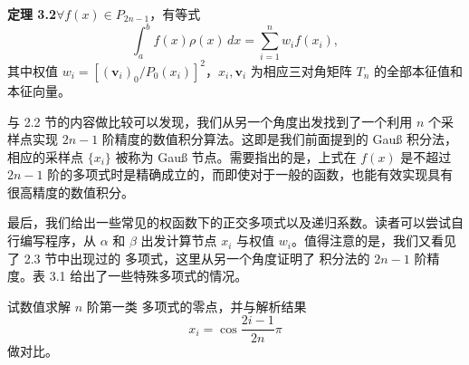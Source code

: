 \textbf{定理 3.2}\quad $\forall f(x)\in P_{2n-1}$，有等式
\begin{equation}
\int_a^b f(x)\rho(x)\,dx=\sum_{i=1}^n w_i f(x_i),
\tag{3.5.44}
\end{equation}
其中权值 $w_i=[(\bm v_i)_0/P_0(x_i)]^2$，$x_i,\bm v_i$ 为相应三对角矩阵 $T_n$ 的全部本征值和本征向量。

与 2.2 节的内容做比较可以发现，我们从另一个角度出发找到了一个利用 $n$ 个采样点实现 $2n-1$ 阶精度的数值积分算法。这即是我们前面提到的 Gauß 积分法，相应的采样点 $\{x_i\}$ 被称为 Gauß 节点。需要指出的是，上式在 $f(x)$ 是不超过 $2n-1$ 阶的多项式时是精确成立的，而即使对于一般的函数，也能有效实现具有很高精度的数值积分。

最后，我们给出一些常见的权函数下的正交多项式以及递归系数。读者可以尝试自行编写程序，从 $\alpha$ 和 $\beta$ 出发计算节点 $x_i$ 与权值 $w_i$。值得注意的是，我们又看见了 2.3 节中出现过的 \ChebName{} 多项式，这里从另一个角度证明了 \ChebName{} 积分法的 $2n-1$ 阶精度。表 3.1 给出了一些特殊多项式的情况。

\begin{table}[htbp]
\centering
\caption{一些特殊多项式的情况}
\label{tab:orthogonal-polynomials}
\small
{}
\end{table}

\begin{exerciseBox}[练习 3.4]
试数值求解 $n$ 阶第一类 \ChebName{} 多项式的零点，并与解析结果
\[
x_i=\cos\frac{2i-1}{2n}\pi
\]
做对比。
\end{exerciseBox}

